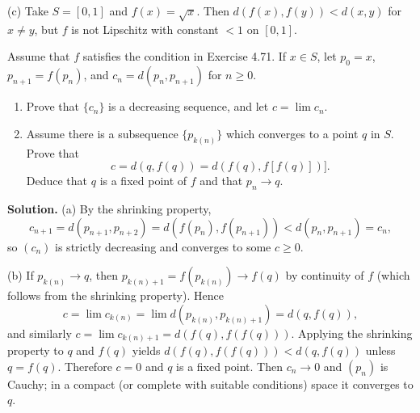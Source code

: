 (c) Take $S=[0,1]$ and $f(x)=\sqrt{x}$. Then $d(f(x),f(y))<d(x,y)$ for $x\ne y$, but $f$ is not Lipschitz with constant $<1$ on $[0,1]$.
\medskip

\begin{problembox}
Assume that $f$ satisfies the condition in Exercise 4.71. If $x \in S$, let $p_0 = x$, $p_{n+1} = f(p_n)$, and $c_n = d(p_n, p_{n+1})$ for $n \geq 0$.
\begin{enumerate}[label=(\alph*)]
\item Prove that $\{c_n\}$ is a decreasing sequence, and let $c = \lim c_n$.
\item Assume there is a subsequence $\{p_{k(n)}\}$ which converges to a point $q$ in $S$. Prove that
\[c = d(q, f(q)) = d(f(q), f[f(q)])].\]
Deduce that $q$ is a fixed point of $f$ and that $p_n \to q$.
\end{enumerate}
\end{problembox}

\noindent\textbf{Solution.}
(a) By the shrinking property,
\[
c_{n+1}=d(p_{n+1},p_{n+2})=d(f(p_n),f(p_{n+1}))<d(p_n,p_{n+1})=c_n,
\]
so $(c_n)$ is strictly decreasing and converges to some $c\ge 0$.

(b) If $p_{k(n)}\to q$, then $p_{k(n)+1}=f(p_{k(n)})\to f(q)$ by continuity of $f$ (which follows from the shrinking property). Hence
\[
c=\lim c_{k(n)}=\lim d(p_{k(n)},p_{k(n)+1})=d(q,f(q)),
\]
and similarly $c=\lim c_{k(n)+1}=d(f(q),f(f(q)))$. Applying the shrinking property to $q$ and $f(q)$ yields $d(f(q),f(f(q)))<d(q,f(q))$ unless $q=f(q)$. Therefore $c=0$ and $q$ is a fixed point. Then $c_n\to 0$ and $(p_n)$ is Cauchy; in a compact (or complete with suitable conditions) space it converges to $q$.
\medskip